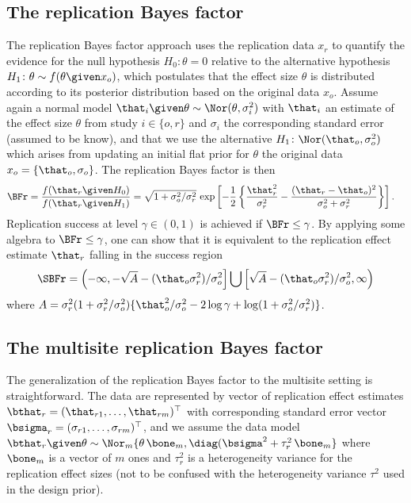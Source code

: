 \begin{subappendices}
\subsection{The replication Bayes factor}
The replication Bayes factor approach uses the replication data $x_{r}$ to
quantify the evidence for the null hypothesis $H_{0}\colon \theta = 0$ relative
to the alternative hypothesis $H_{1} \colon \theta \sim f(\theta \given x_{o})$,
which postulates that the effect size $\theta$ is distributed according to its
posterior distribution based on the original data $x_{o}$. Assume again a normal
model $\that_{i} \given \theta \sim \Nor(\theta, \sigma^{2}_{i})$ with
$\that_{i}$ an estimate of the effect size $\theta$ from study $i \in \{o, r\}$
and $\sigma_{i}$ the corresponding standard error (assumed to be know), and that
we use the alternative $H_{1} \colon \Nor(\that_{o}, \sigma^{2}_{o})$ which
arises from updating an initial flat prior for $\theta$ the original data
$x_{o} = \{\that_{o}, \sigma_{o}\}$. The replication Bayes factor is then
\begin{align}
  \label{eq3sup:bfr}
  \BFr &= \frac{f(\that_{r} \given H_{0})}{f(\that_{r} \given H_{1})}
       = \sqrt{1 + \sigma^{2}_{o}/\sigma^{2}_{r}} \, \exp\left[
         -\frac{1}{2}\left\{ \frac{\that^{2}_{r}}{\sigma^{2}_{r}} -
         \frac{(\that_{r} - \that_{o})^{2}}{\sigma^{2}_{o} + \sigma^{2}_{r}}
         \right\}\right].
\end{align}
Replication success at level $\gamma \in (0, 1)$ is achieved if
$\BFr \leq \gamma$. By applying some algebra to $\BFr \leq \gamma$, one can show
that it is equivalent to the replication effect estimate $\that_{r}$ falling in
the success region
\begin{align*}
  \SBFr
  = \left(-\infty, -\sqrt{A} - (\that_{o}\sigma^{2}_{r})/\sigma^{2}_{o}\right] \bigcup
   \left[\sqrt{A} - (\that_{o}\sigma^{2}_{r})/\sigma^{2}_{o}, \infty\right)
\end{align*}
where
$A = \sigma^{2}_{r}(1 + \sigma^{2}_{r}/\sigma^{2}_{o}) \{\that_{o}^{2}/\sigma^{2}_{o} - 2 \log \gamma + \log(1 + \sigma^{2}_{o}/\sigma^{2}_{r})\}$.

\subsection{The multisite replication Bayes factor}
The generalization of the replication Bayes factor to the multisite setting is
straightforward. The data are represented by vector of replication effect
estimates $\bthat_{r} = (\that_{r1}, \dots, \that_{rm})^{\top}$ with
corresponding standard error vector
$\bsigma_{r} = (\sigma_{r1}, \dots, \sigma_{rm})^{\top}$, and we assume the data
model
$\bthat_{r} \given \theta \sim \Nor_{m}\{\theta \, \bone_{m}, \diag(\bsigma^{2} + \tau^{2}_{r} \, \bone_{m}\}$
where $\bone_{m}$ is a vector of $m$ ones and $\tau^{2}_{r}$ is a heterogeneity
variance for the replication effect sizes (not to be confused with the
heterogeneity variance $\tau^{2}$ used in the design prior).


\end{subappendices}
